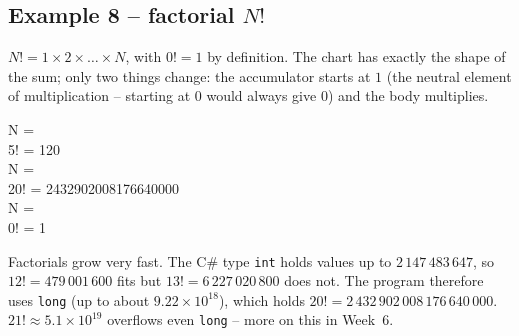 \documentclass[11pt,a4paper]{article}
\begin{document}
\subsection{Example 8 -- factorial $N!$}
$N! = 1 \times 2 \times \dots \times N$, with $0! = 1$ by definition. The chart has exactly the shape of the sum; only two things change: the accumulator starts at $1$ (the neutral element of multiplication -- starting at $0$ would always give $0$) and the body multiplies.
\begin{center}
\begin{minipage}[c]{0.54\linewidth}\centering
{}
\end{minipage}\hfill
\begin{minipage}[c]{0.42\linewidth}
\begin{consolebox}
N = \\ 5! = 120\\
N = \\ 20! = 2432902008176640000\\
N = \\ 0! = 1
\end{consolebox}
\end{minipage}
\end{center}
\begin{notebox}
Factorials grow very fast. The C\# type \texttt{int} holds values up to $2\,147\,483\,647$, so $12! = 479\,001\,600$ fits but $13! = 6\,227\,020\,800$ does not. The program therefore uses \texttt{long} (up to about $9.22\times10^{18}$), which holds $20! = 2\,432\,902\,008\,176\,640\,000$. $21! \approx 5.1 \times 10^{19}$ overflows even \texttt{long} -- more on this in Week~6.
\end{notebox}
\end{document}
